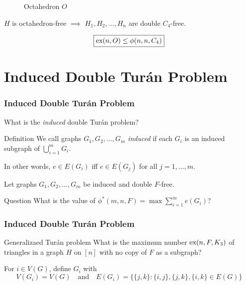 \documentclass{beamer}
\newcommand*{\ex}{\textnormal{ex}}
\begin{document}
\begin{frame}
{\begin{figure}
      \caption{Octahedron $O$}
    \end{figure}

    \begin{center}
      $H$ is octahedron-free $\implies$ $H_1, H_2, \ldots, H_n$ are double $C_4$-free.
    \end{center}
  
    \[
      \boxed{\ex(n, O) \leq \phi(n, n, C_4)}
    \]
  }
\end{frame}

\section{Induced Double Turán Problem}

\begin{frame}
  \frametitle{Induced Double Turán Problem}

  What is the \textit{induced} double Turán problem? \pause

  \begin{block}{Definition}
    We call graphs $G_1, G_2, \ldots, G_m$ \textit{induced} if each $G_i$ is an induced subgraph of $\bigcup_{i = 1}^m G_i$.
  \end{block}

  \pause

  In other words, $e \in E(G_i)$ iff $e \in E(G_j)$ for all $j = 1, \ldots, m$.

  \pause

  \vspace{0.5cm}

  Let graphs $G_1, G_2, \ldots, G_m$ be induced and double $F$-free.

  \begin{block}{Question}
    What is the value of $\phi^*(m, n, F) = \max \sum_{i = 1}^m e(G_i)$?
  \end{block}
\end{frame}

\begin{frame}
  \frametitle{Induced Double Turán Problem}

  \begin{block}{Generalizaed Turán problem}
    What is the maximum number $\ex(n, F, K_3)$ of triangles in a graph $H$ on $[n]$ with no copy of $F$ as a subgraph?
  \end{block}

  \pause 

  \vspace{0.5cm}

  For $i \in V(G)$, define $G_i$ with
  \[
    V(G_i) = V(G) \quad \text{and} \quad E(G_i) = \{\{j, k\} : \{i, j\}, \{j, k\}, \{i, k\} \in E(G)\}
  \]
\end{frame}
\end{document}
